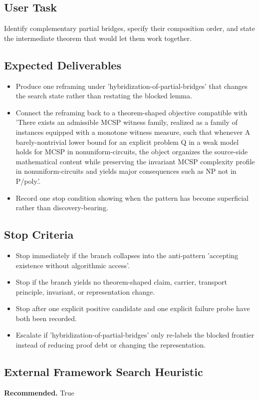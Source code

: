 \documentclass[11pt]{article}
\begin{document}
\subsection*{User Task}
Identify complementary partial bridges, specify their composition order, and state the intermediate theorem that would let them work together.

\subsection*{Expected Deliverables}
\begin{itemize}[leftmargin=*,itemsep=0.2em]
\item Produce one reframing under 'hybridization-of-partial-bridges' that changes the search state rather than restating the blocked lemma.
\item Connect the reframing back to a theorem-shaped objective compatible with 'There exists an admissible MCSP witness family, realized as a family of instances equipped with a monotone witness measure, such that whenever A barely-nontrivial lower bound for an explicit problem Q in a weak model holds for MCSP in nonuniform-circuits, the object organizes the source-side mathematical content while preserving the invariant MCSP complexity profile in nonuniform-circuits and yields major consequences such as NP not in P/poly.'.
\item Record one stop condition showing when the pattern has become superficial rather than discovery-bearing.
\end{itemize}
\subsection*{Stop Criteria}
\begin{itemize}[leftmargin=*,itemsep=0.2em]
\item Stop immediately if the branch collapses into the anti-pattern 'accepting existence without algorithmic access'.
\item Stop if the branch yields no theorem-shaped claim, carrier, transport principle, invariant, or representation change.
\item Stop after one explicit positive candidate and one explicit failure probe have both been recorded.
\item Escalate if 'hybridization-of-partial-bridges' only re-labels the blocked frontier instead of reducing proof debt or changing the representation.
\end{itemize}
\subsection*{External Framework Search Heuristic}
\textbf{Recommended.} True
\end{document}
